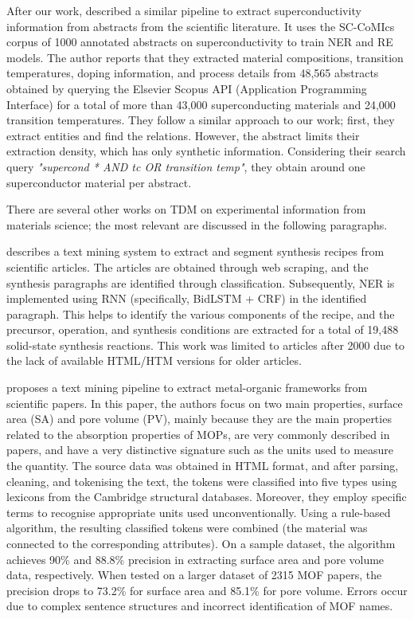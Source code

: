 After our work, \cite{mitsui2023automatic} described a similar pipeline to extract superconductivity information from abstracts from the scientific literature.
It uses the SC-CoMIcs~\cite{yamaguchi-etal-2020-sc} corpus of 1000 annotated abstracts on superconductivity to train NER and RE models.
The author reports that they extracted material compositions, transition temperatures, doping information, and process details from 48,565 abstracts obtained by querying the Elsevier Scopus API (Application Programming Interface) for a total of more than 43,000 superconducting materials and 24,000 transition temperatures. 
They follow a similar approach to our work; first, they extract entities and find the relations. 
However, the abstract limits their extraction density, which has only synthetic information. Considering their search query \textit{"supercond * AND tc OR transition temp"}, they obtain around one superconductor material per abstract. 

There are several other works on TDM on experimental information from materials science; the most relevant are discussed in the following paragraphs. 

\cite{kononova2019text} describes a text mining system to extract and segment synthesis recipes from scientific articles. The articles are obtained through web scraping, and the synthesis paragraphs are identified through classification. Subsequently, NER is implemented using RNN (specifically, BidLSTM + CRF) in the identified paragraph. This helps to identify the various components of the recipe, and the precursor, operation, and synthesis conditions are extracted for a total of 19,488 solid-state synthesis reactions.
This work was limited to articles after 2000 due to the lack of available HTML/HTM versions for older articles.

\cite{park2018text} proposes a text mining pipeline to extract metal-organic frameworks from scientific papers. In this paper, the authors focus on two main properties, surface area (SA) and pore volume (PV), mainly because they are the main properties related to the absorption properties of MOPs, are very commonly described in papers, and have a very distinctive signature such as the units used to measure the quantity. 
The source data was obtained in HTML format, and after parsing, cleaning, and tokenising the text, the tokens were classified into five types using lexicons from the Cambridge structural databases. 
Moreover, they employ specific terms to recognise appropriate units used unconventionally. Using a rule-based algorithm, the resulting classified tokens were combined (the material was connected to the corresponding attributes).
On a sample dataset, the algorithm achieves 90\% and 88.8\% precision in extracting surface area and pore volume data, respectively.
When tested on a larger dataset of 2315 MOF papers, the precision drops to 73.2\% for surface area and 85.1\% for pore volume. Errors occur due to complex sentence structures and incorrect identification of MOF names.

